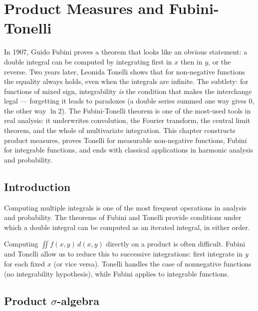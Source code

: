 \chapter{Product Measures and Fubini-Tonelli}
\label{ch:fubini}

In 1907, Guido Fubini proves a theorem that looks like an obvious statement: a double integral can be computed by integrating first in $x$ then in $y$, or the reverse. Two years later, Leonida Tonelli shows that for non-negative functions the equality always holds, even when the integrals are infinite. The subtlety: for functions of mixed sign, integrability \emph{is} the condition that makes the interchange legal --- forgetting it leads to paradoxes (a double series summed one way gives $0$, the other way $\ln 2$). The Fubini-Tonelli theorem is one of the most-used tools in real analysis: it underwrites convolution, the Fourier transform, the central limit theorem, and the whole of multivariate integration. This chapter constructs product measures, proves Tonelli for measurable non-negative functions, Fubini for integrable functions, and ends with classical applications in harmonic analysis and probability.

\section{Introduction}

Computing multiple integrals is one of the most frequent operations in analysis and
probability. The theorems of Fubini and Tonelli provide conditions under which a
double integral can be computed as an iterated integral,
in either order.

\begin{intuition}[title=\textbf{Why Fubini-Tonelli?}]
Computing $\iint f(x,y)\, d(x,y)$ directly on a product is often difficult.
Fubini and Tonelli allow us to reduce this to successive integrations: first
integrate in $y$ for each fixed $x$ (or vice versa). Tonelli handles the case of
nonnegative functions (no integrability hypothesis), while Fubini applies to
integrable functions.
\end{intuition}

\section{Product $\sigma$-algebra}

